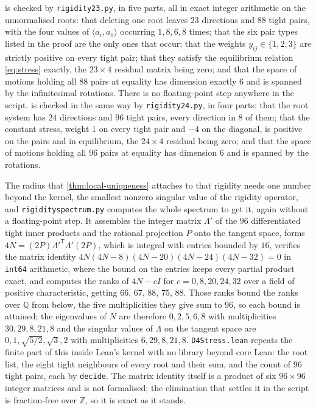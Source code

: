 \documentclass[11pt,reqno]{amsart}
\renewcommand{\_}{\origunderscore\allowbreak}
\numberwithin{equation}{section}
\theoremstyle{plain}
\theoremstyle{definition}
\theoremstyle{remark}
\begin{document}
 is checked by \texttt{rigidity23.py}, in five
parts, all in exact integer arithmetic on the unnormalised roots: that
deleting one root leaves $23$ directions and $88$ tight pairs, with the
four values of $\langle a_i,a_0\rangle$ occurring $1,8,6,8$ times; that
the six pair types listed in the proof are the only ones that occur;
that the weights $y_{ij}\in\{1,2,3\}$ are strictly positive on
every tight pair; that they satisfy the equilibrium relation
\eqref{eq:stress} exactly, the $23\times4$ residual matrix being zero;
and that the space of motions holding all $88$ pairs at equality has
dimension exactly $6$ and is spanned by the infinitesimal rotations.
There is no floating-point step anywhere in the script.
 is checked in the same way by
\texttt{rigidity24.py}, in four parts: that the root system has $24$
directions and $96$ tight pairs, every direction in $8$ of them; that the
constant stress, weight $1$ on every tight pair and $-4$ on the diagonal,
is positive on the pairs and in equilibrium, the $24\times4$ residual
being zero; and that the space of motions holding all $96$ pairs at
equality has dimension $6$ and is spanned by the rotations.

The radius that \cref{thm:local-uniqueness} attaches to that rigidity
needs one number beyond the kernel, the smallest nonzero singular value
of the rigidity operator, and \texttt{rigidity\_spectrum.py} computes
the whole spectrum to get it, again without a floating-point step. It
assembles the integer matrix $\Lambda'$ of the $96$ differentiated tight
inner products and the rational projection $P$ onto the tangent space,
forms $4N=(2P)\Lambda'^{\mathsf T}\Lambda'(2P)$, which is integral with
entries bounded by $16$, verifies the matrix identity
$4N(4N-8)(4N-20)(4N-24)(4N-32)=0$ in \texttt{int64} arithmetic, where
the bound on the entries keeps every partial product exact, and computes
the ranks of $4N-cI$ for $c=0,8,20,24,32$ over a field of positive
characteristic, getting $66$, $67$, $88$, $75$, $88$. Those ranks bound
the ranks over $\mathbb{Q}$ from below, the five multiplicities they
give sum to $96$, so each bound is attained; the eigenvalues of $N$ are
therefore $0,2,5,6,8$ with multiplicities $30,29,8,21,8$ and the
singular values of $\Lambda$ on the tangent space are
$0,1,\sqrt{5/2},\sqrt3,2$ with multiplicities $6,29,8,21,8$.
\texttt{D4Stress.lean} repeats the finite part of this inside Lean's
kernel with no library beyond core Lean: the root list, the eight tight
neighbours of every root and their sum, and the count of $96$ tight
pairs, each by \texttt{decide}. The matrix identity itself is a product
of six $96\times96$ integer matrices and is not formalised; the
elimination that settles it in the script is fraction-free over
$\mathbb{Z}$, so it is exact as it stands.
\end{document}
